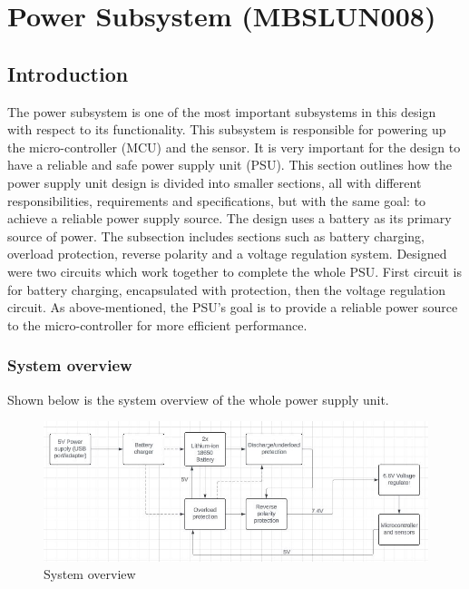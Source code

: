 \documentclass[class=report,11pt,crop=false]{standalone}
\begin{document}
	\chapter{Power Subsystem (MBSLUN008)}
	\vspace{0.5cm}
	\section{Introduction}
	The power subsystem is one of the most important subsystems in this design with respect to its functionality. This subsystem is responsible for powering up the micro-controller (MCU) and the sensor. It is very important for the design to have a reliable and safe power supply unit (PSU). This section outlines how the power supply unit design is divided into smaller sections, all with different responsibilities, requirements and specifications, but with the same goal: to achieve a reliable power supply source. The design uses a battery as its primary source of power. The subsection includes sections such as battery charging, overload protection, reverse polarity and a voltage regulation system. Designed were two circuits which work together to complete the whole PSU. First circuit is for battery charging, encapsulated with protection, then the voltage regulation circuit. As above-mentioned, the PSU's goal is to provide a reliable power source to the micro-controller for more efficient performance. 
	
	\subsection{System overview}
	
	Shown below is the system overview of the whole power supply unit. 
	
	\begin{figure}[h!]
		\centering
		\includegraphics[width=1.2\linewidth]{Figures/flow diagram.jpg}
		\caption{System overview}
		\label{fig:P1}
	\end{figure}
	
\end{document}
